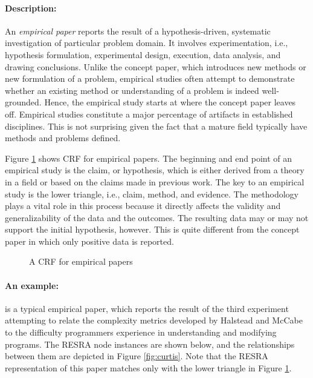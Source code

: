 \begin{itemize}
{\paragraph{Description:}

An {\it empirical paper} reports the result of a hypothesis-driven,
systematic investigation of particular problem domain. It involves
experimentation, i.e., hypothesis formulation, experimental design,
execution, data analysis, and drawing conclusions. Unlike the concept
paper, which introduces new methods or new formulation of a problem,
empirical studies often attempt to demonstrate whether an existing method
or understanding of a problem is indeed well-grounded. Hence, the empirical
study starts at where the concept paper leaves off. Empirical studies
constitute a major percentage of artifacts in established disciplines.
This is not surprising given the fact that a mature field typically have
methods and problems defined.

Figure \ref{fig:empirical-crf} shows CRF for empirical papers. The
beginning and end point of an empirical study is the claim, or hypothesis,
which is either derived from a theory in a field or based on the claims
made in previous work. The key to an empirical study is the lower triangle,
i.e., claim, method, and evidence. The methodology plays a vital role in
this process because it directly affects the validity and generalizability
of the data and the outcomes. The resulting data may or may not support the
initial hypothesis, however. This is quite different from the concept paper
in which only positive data is reported.

\begin{figure}[htb]
  \caption{A CRF for empirical papers}
  \label{fig:empirical-crf}
\end{figure}


\paragraph{An example:}

\cite{Curtis79} is a typical empirical paper, which reports the result of
the third experiment attempting to relate the complexity metrics developed
by Halstead and McCabe to the difficulty programmers experience in
understanding and modifying programs. The RESRA node instances are shown
below, and the relationships between them are depicted in Figure
\ref{fig:curtis}. Note that the RESRA representation of this paper matches
only with the lower triangle in Figure \ref{fig:empirical-crf}.

}
\end{itemize}
